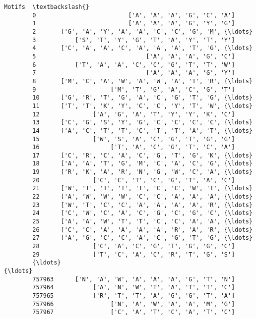 \documentclass[11pt]{article}
\begin{document}
\begin{Verbatim}[commandchars=\\\{\}]
                                                           Motifs  \textbackslash{}
        0                          ['A', 'A', 'A', 'G', 'C', 'A']   
        1                          ['A', 'A', 'A', 'G', 'Y', 'G']   
        2       ['G', 'A', 'Y', 'A', 'A', 'C', 'C', 'G', 'M', {\ldots}   
        3           ['S', 'T', 'Y', 'G', 'T', 'A', 'Y', 'T', 'Y']   
        4       ['C', 'A', 'A', 'C', 'A', 'A', 'A', 'T', 'G', {\ldots}   
        5                               ['A', 'A', 'A', 'G', 'C']   
        6           ['T', 'A', 'A', 'C', 'C', 'G', 'T', 'T', 'W']   
        7                               ['A', 'A', 'A', 'G', 'Y']   
        8       ['M', 'C', 'A', 'W', 'A', 'W', 'A', 'T', 'R', {\ldots}   
        9                     ['M', 'T', 'G', 'A', 'C', 'G', 'T']   
        10      ['G', 'R', 'T', 'G', 'A', 'C', 'G', 'T', 'G', {\ldots}   
        11      ['T', 'T', 'K', 'Y', 'C', 'C', 'Y', 'T', 'W', {\ldots}   
        12               ['A', 'G', 'A', 'T', 'Y', 'Y', 'K', 'C']   
        13      ['C', 'G', 'S', 'Y', 'G', 'C', 'C', 'C', 'C', {\ldots}   
        14      ['A', 'C', 'T', 'T', 'C', 'T', 'T', 'A', 'T', {\ldots}   
        15               ['W', 'S', 'A', 'C', 'G', 'T', 'G', 'G']   
        16                    ['T', 'A', 'C', 'G', 'T', 'C', 'A']   
        17      ['C', 'R', 'C', 'A', 'C', 'G', 'T', 'G', 'K', {\ldots}   
        18      ['A', 'A', 'T', 'G', 'M', 'C', 'A', 'C', 'G', {\ldots}   
        19      ['R', 'K', 'A', 'R', 'N', 'G', 'W', 'C', 'A', {\ldots}   
        20               ['C', 'C', 'T', 'C', 'G', 'T', 'A', 'C']   
        21      ['W', 'T', 'T', 'T', 'T', 'C', 'C', 'W', 'T', {\ldots}   
        22      ['A', 'W', 'W', 'W', 'C', 'C', 'A', 'A', 'A', {\ldots}   
        23      ['W', 'T', 'C', 'C', 'A', 'A', 'A', 'A', 'R', {\ldots}   
        24      ['C', 'W', 'C', 'A', 'C', 'G', 'C', 'G', 'C', {\ldots}   
        25      ['A', 'A', 'W', 'T', 'T', 'C', 'C', 'A', 'A', {\ldots}   
        26      ['C', 'C', 'A', 'A', 'A', 'A', 'R', 'A', 'R', {\ldots}   
        27      ['A', 'G', 'C', 'C', 'A', 'C', 'G', 'T', 'G', {\ldots}   
        28               ['C', 'A', 'C', 'G', 'T', 'G', 'G', 'C']   
        29               ['T', 'C', 'A', 'C', 'R', 'T', 'G', 'S']   
        {\ldots}                                                   {\ldots}   
        757963      ['N', 'A', 'W', 'A', 'A', 'A', 'G', 'T', 'N']   
        757964           ['A', 'N', 'W', 'T', 'A', 'T', 'T', 'C']   
        757965           ['R', 'T', 'T', 'A', 'G', 'G', 'T', 'A']   
        757966                ['N', 'A', 'W', 'A', 'A', 'M', 'G']   
        757967                ['C', 'A', 'T', 'C', 'A', 'T', 'C']   

\end{Verbatim}
\end{document}
